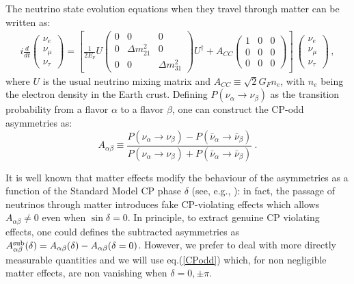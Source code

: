 \documentclass[12pt]{article}
\begin{document}
The neutrino state evolution equations when they travel through matter can be written as:
\begin{eqnarray} \label{evol}
i \frac{d}{dt} \left( \begin{array}{c} 
                   \nu_e \\ \nu_\mu \\ \nu_\tau 
                   \end{array}  \right)
 = \left[\frac{1}{2 E_\nu} U\left( \begin{array}{ccc}
                   0   & 0          & 0   \\
                   0   & \Delta m^2_{21}  & 0  \\
                   0   & 0           &  \Delta m^2_{31}  
                   \end{array} \right) U^{\dagger} +  
                  A_{CC} \left( \begin{array}{ccc}
            1      & 0 & 0 \\
            0  & 0  & 0 \\
            0 & 0 & 0
                   \end{array} 
                   \right) \right] ~
\left( \begin{array}{c} 
                   \nu_e \\ \nu_\mu \\ \nu_\tau 
                   \end{array}  \right)\, ,
\label{eq:matter}
\end{eqnarray}
where $U$ is the usual neutrino mixing matrix and $A_{CC}\equiv \sqrt 2 G_F n_e$, with $n_e$ being the electron density in the Earth crust. Defining $P(\nu_\alpha \to \nu_\beta)$ as the transition probability from a flavor $\alpha$ to a flavor $\beta$, one can construct the CP-odd asymmetries as:
\begin{equation}
A_{\alpha \beta} \equiv \frac{
P(\nu_\alpha\to \nu_\beta)-P(\bar{\nu}_\alpha \to \bar{\nu}_\beta)}
{P(\nu_\alpha \to \nu_\beta)+P(\bar{\nu}_\alpha \to \bar{\nu}_\beta)} \ .
\label{CPodd}
\end{equation}

It is well known that 
matter effects modify the behaviour of the asymmetries as a function of the Standard Model CP phase $\delta$ (see, e.g., \cite{Donini:1999jc}): in fact, the passage of neutrinos through matter introduces fake CP-violating effects which allows $A_{\alpha\beta}\ne 0$ even when $\sin \delta=0$. In principle, to extract genuine CP violating effects, one could defines the  subtracted asymmetries as  $A^{\rm sub}_{\alpha\beta}(\delta)=A_{\alpha\beta}(\delta)-A_{\alpha\beta}(\delta=0)$. However, we prefer to deal with more directly measurable quantities and we will use eq.(\ref{CPodd}) which, for non negligible matter effects, are non vanishing when $\delta=0,\pm \pi$.
\end{document}
